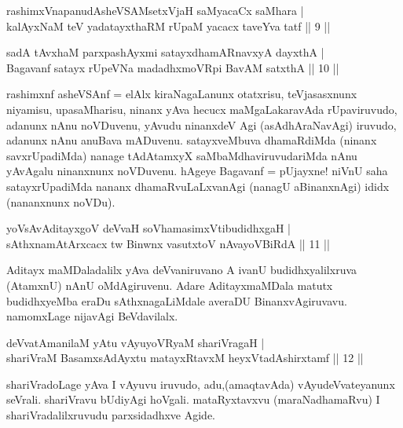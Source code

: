 
\begin{shl}
rashimxVnapanudAsheVSAMsetxVjaH saMyacaCx saMhara | \\
kalAyxNaM teV yadatayxthaRM rUpaM yacacx taveYva tatf \hfill||  9 || 
\end{shl}

\begin{shl}
sadA tAvx\s haM parxpashAyxmi satayxdhamARnavxyA dayxthA  | \\
Bagavanf satayx rUpeVNa madadhxmoVR\s pi BavAM satxthA \hfill||  10 || 
\end{shl}

\begin{artha} 
rashimxnf asheVSAnf = elAlx kiraNagaLanunx otatxrisu, teVjasasxnunx 
niyamisu, upasaMharisu, ninanx yAva hecucx maMgaLakaravAda 
rUpaviruvudo, adanunx nAnu noVDuvenu, yAvudu ninanxdeV Agi 
(asAdhAraNavAgi) iruvudo, adanunx nAnu anuBava mADuvenu. satayxveMbuva 
dhamaRdiMda (ninanx savxrUpadiMda) nanage tAdAtamxyX 
saMbaMdhaviruvudariMda nAnu yAvAgalu ninanxnunx noVDuvenu. hAgeye 
Bagavanf = pUjayxne! niVnU saha satayxrUpadiMda nananx 
dhamaRvuLaLxvanAgi (nanagU aBinanxnAgi) ididx (nananxnunx noVDu).
\end{artha}


\begin{shl}
yoV\s sAvAditayxgoV deVvaH soV\s hamasimxVtibudidhxgaH | \\
sAthxnamAtArxcacx tw Binwnx vasutxtoV nA\s \s vayoVBiRdA \hfill||  11 || 
\end{shl}

\begin{artha} 
Aditayx maMDaladalilx yAva deVvaniruvano A ivanU budidhxyalilxruva 
(AtamxnU) nAnU oMdAgiruvenu. Adare AditayxmaMDala matutx budidhxyeMba 
eraDu sAthxnagaLiMdale averaDU BinanxvAgiruvavu. namomxLage nijavAgi 
BeVdavilalx.
\end{artha}


\begin{shl}
deVvatAmanilaM yAtu vAyuyoVR\s yaM shariVragaH | \\
shariVraM BasamxsAdAyxtu matayxRtavxM heyxVtadAshirxtamf \hfill||  12 || 
\end{shl}

\begin{artha} 
shariVradoLage yAva I vAyuvu iruvudo, adu,\break (amaqtavAda) 
vAyudeVvateyanunx seVrali. shariVravu bUdiyAgi hoVgali. mataRyxtavxvu 
(maraNadhamaRvu) I shariVradalilxruvudu parxsidadhxve Agide.
\end{artha}

